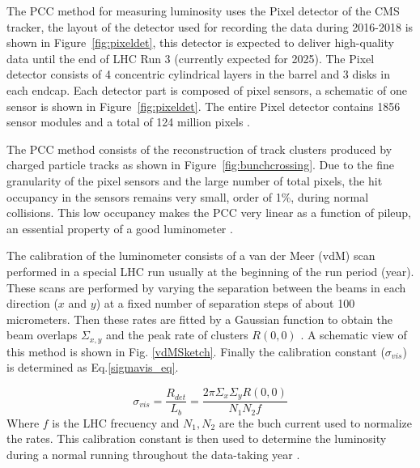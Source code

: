 \documentclass[final,12p]{article}
\begin{document}
The PCC method for measuring luminosity uses the Pixel detector of the CMS tracker, the layout of the  detector used for recording the data during 2016-2018 is shown in Figure~\ref{fig:pixeldet},  this detector is expected to deliver high-quality data until the end of LHC Run 3 (currently expected for 2025).
The Pixel detector consists of 4 concentric cylindrical layers in the barrel and 3 disks in each endcap.
Each detector part is composed of pixel sensors, a schematic of one sensor is shown in Figure~\ref{fig:pixeldet}.
The entire Pixel detector contains 1856 sensor modules and a total of 124 million pixels \cite{TrackerGroupoftheCMS:2020bgg}.

The PCC method consists of the reconstruction of track clusters produced by charged particle tracks as shown in Figure~\ref{fig:bunchcrossing}.
Due to the fine granularity of the pixel sensors and the large number of total pixels, the hit occupancy in the sensors remains very small, order of 1\%, during normal collisions.
This low occupancy makes the PCC  very linear as a function of pileup, an essential property of a good luminometer \cite{Sirunyan:2021qkt}.


The calibration of the luminometer consists of a van der Meer (vdM) scan performed in a special LHC run usually at the beginning of the run period (year).
These scans are performed by varying the separation between the beams in each direction ($x$ and $y$) at a fixed number of separation steps of about 100 micrometers. Then these rates are fitted by a Gaussian function to obtain the beam overlaps $\Sigma_{x,y}$ and the peak rate of clusters $R(0,0)$ \cite{CMS:2018}. A schematic view of this method is shown in Fig. \ref{vdMSketch}. 
Finally the calibration constant ($\sigma_{vis}$) is determined as Eq.\ref{sigmavis_eq}.

\begin{equation}
  \sigma_{vis}=\frac{R_{det}}{L_{b}}=\frac{2\pi \Sigma_{x} \Sigma_{y} R(0, 0)}{N_{1}N_{2} f}
  \label{sigmavis_eq}
\end{equation}
Where $f$  is the LHC frecuency and $N_{1},N_{2}$ are the buch current used to normalize  the rates.
This calibration constant is then used to determine the luminosity during a normal running throughout the data-taking year \cite{CMS:2018}.

\end{document}

